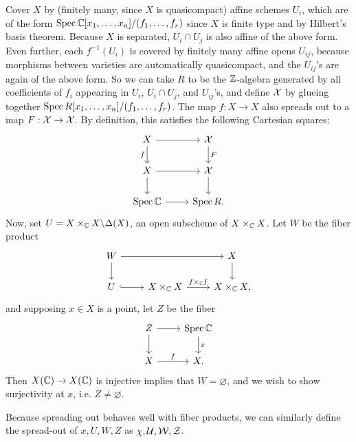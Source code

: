\documentclass[11pt]{amsart}
\begin{document}
Cover $X$ by (finitely many, since $X$ is quasicompact) affine schemes $U_i$, which are of the form $\operatorname{Spec} \mathbb{C}[x_1,\dots,x_n]/(f_1,\dots,f_r)$ since $X$ is finite type and by Hilbert's basis theorem. Because $X$ is separated, $U_i\cap U_j$ is also affine of the above form. Even further, each $f^{-1}(U_i)$ is covered by finitely many affine opens $U_{ij}$, because morphisms between varieties are automatically quasicompact, and the $U_{ij}$'s are again of the above form. So we can take $R$ to be the $\mathbb{Z}$-algebra generated by all coefficients of $f_i$ appearing in $U_i$, $U_i\cap U_j$, and $U_{ij}$'s, and define $\mathcal{X}$ by glueing together $\operatorname{Spec} R[x_1,\dots,x_n]/(f_1,\dots,f_r)$. The map $f:X\to X$ also spreads out to a map $F: \mathcal{X} \to \mathcal{X}$. By definition, this satisfies the following Cartesian squares:
\[
\begin{tikzcd}
X \arrow[r] \arrow[d, "f"'] & \cX \arrow[d, "F"] \\
X \arrow[r] \arrow[d] & \cX \arrow[d] \\
\Spec \CC \arrow[r] & \Spec R.
\end{tikzcd}
\]
Now, set $U = X\times_{\mathbb{C}} X \backslash \Delta(X)$, an open subscheme of $X\times_{\mathbb{C}} X$. Let $W$ be the fiber product
\[
\begin{tikzcd}
W \arrow[rr] \arrow[d] & & X \arrow[d] \\
U \arrow[r, hook] & X\times_{\CC} X \arrow[r, "f\times_{\CC} f"] & X\times_{\CC} X,
\end{tikzcd}
\]
and supposing $x\in X$ is a point, let $Z$ be the fiber
\[
\begin{tikzcd}
Z \arrow[r] \arrow[d] & \Spec \CC \arrow[d, "x"] \\
X \arrow[r, "f"] & X.
\end{tikzcd}
\]
Then $X(\mathbb{C})\to X(\mathbb{C})$ is injective implies that $W = \varnothing$, and we wish to show surjectivity at $x$, i.e. $Z \neq \varnothing$.

Because spreading out behaves well with fiber products, we can similarly define the spread-out of $x, U, W, Z$ as $\chi, \mathcal{U}, \mathcal{W}, \mathcal{Z}$.
\end{document}
